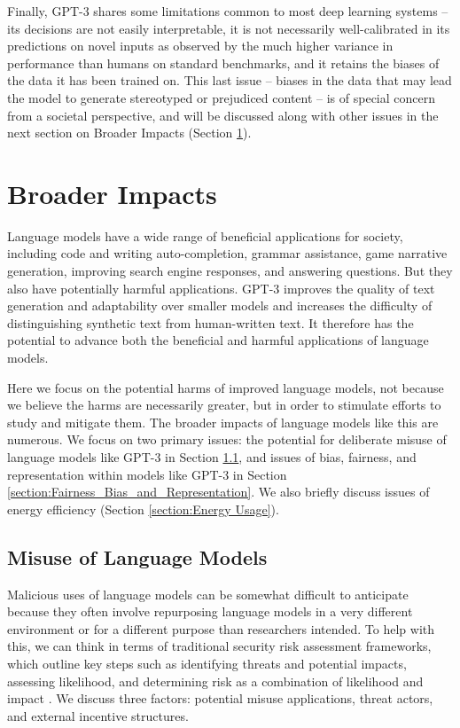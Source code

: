 Finally, GPT-3 shares some limitations common to most deep learning systems -- its decisions are not easily interpretable, it is not necessarily well-calibrated in its predictions on novel inputs as observed by the much higher variance in performance than humans on standard benchmarks, and it retains the biases of the data it has been trained on.  This last issue -- biases in the data that may lead the model to generate stereotyped or prejudiced content -- is of special concern from a societal perspective, and will be discussed along with other issues in the next section on Broader Impacts (Section \ref{section:Broader_Impacts}).

\section{Broader Impacts}
\label{section:Broader_Impacts}

Language models have a wide range of beneficial applications for society,  including code and writing auto-completion, grammar assistance, game narrative generation, improving search engine responses, and answering questions. But they also have potentially harmful applications. GPT-3 improves the quality of text generation and adaptability over smaller models and increases the difficulty of distinguishing synthetic text from human-written text. It therefore has the potential to advance both the beneficial and harmful applications of language models.

Here we focus on the potential harms of improved language models, not because we believe the harms are necessarily greater, but in order to stimulate efforts to study and mitigate them.  The broader impacts of language models like this are numerous. We focus on two primary issues: the potential for deliberate misuse of language models like GPT-3 in Section \ref{section:misuse_of_language_models}, and issues of bias, fairness, and representation within models like GPT-3 in Section \ref{section:Fairness_Bias_and_Representation}.  We also briefly discuss issues of energy efficiency (Section \ref{section:Energy Usage}).

    \subsection{Misuse of Language Models}
    \label{section:misuse_of_language_models}

Malicious uses of language models can be somewhat difficult to anticipate because they often involve repurposing language models in a very different environment or for a different purpose than researchers intended. To help with this, we can think in terms of traditional security risk assessment frameworks, which outline key steps such as identifying threats and potential impacts, assessing likelihood, and determining risk as a combination of likelihood and impact \cite{ross2012risk}.  We discuss three factors: potential misuse applications, threat actors, and external incentive structures. 

